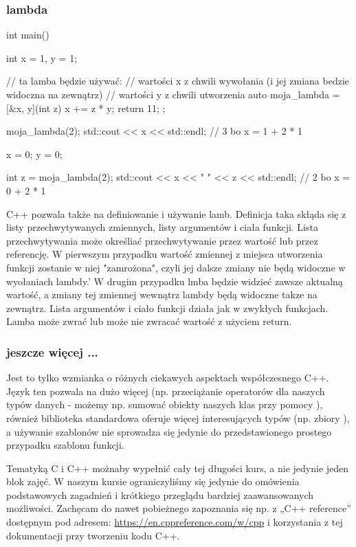 \subsubsection{lambda}

\begin{CodeFrame*}[cpp]{}
int main() {
    int x = 1, y = 1;

    // ta lamba będzie używać:
    //  wartości x z chwili wywołania (i jej zmiana bedzie widoczna na zewnątrz)
    //  wartości y z chwili utworzenia
    auto moja_lambda = [&x, y](int z) { x += z * y; return 11; };

    moja_lambda(2);
    std::cout << x << std::endl; // 3 bo x = 1 + 2 * 1

    x = 0;
    y = 0;

    int z = moja_lambda(2);
    std::cout << x << " " << z << std::endl; // 2 bo x = 0 + 2 * 1
}
\end{CodeFrame*}

C++ pozwala także na definiowanie i używanie lamb.
Definicja taka skłąda się z listy przechwytywanych zmiennych, listy argumentów i ciała funkcji. Lista przechwytywania może określiać przechwytywanie przez wartość lub przez referencję. W pierwszym przypadku wartość zmiennej z miejsca utworzenia funkcji zostanie w niej "zamrożona", czyli jej dalsze zmiany nie będą widoczne w wyołaniach lambdy.' W drugim przypadku lmba będzie widzieć zawsze aktualną wartość, a zmiany tej zmiennej wewnątrz lambdy będą widoczne takze na zewnątrz. Lista argumentów i ciało funkcji działa jak w zwykłych funkcjach. Lamba może zwrać lub może nie zwracać wartość z użyciem return.

\subsubsection{jeszcze więcej ... }

Jest to tylko wzmianka o różnych ciekawych aspektach współczesnego C++. Język ten pozwala na dużo więcej (np. przeciążanie operatorów dla naszych typów danych - możemy np. sumować obiekty naszych klas przy pomocy \cpp{+}), również biblioteka standardowa oferuje więcej interesujących typów (np. zbiory ), a używanie szablonów nie sprowadza się jedynie do przedstawionego prostego przypadku szablonu funkcji.

Tematyką C i C++ możnaby wypełnić cały tej długości kurs, a nie jedynie jeden blok zajęć. W naszym kursie ograniczyliśmy się jedynie do omówienia podstawowych zagadnień i krótkiego przeglądu bardziej zaawansowanych możliwości. Zachęcam do nawet pobieżnego zapoznania się np. z „C++ reference” dostępnym pod adresem: \url{https://en.cppreference.com/w/cpp} i korzystania z tej dokumentacji przy tworzeniu kodu C++.
